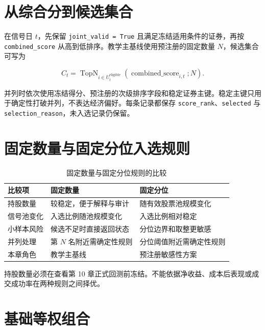 \section{从综合分到候选集合}

在信号日 \(t\)，先保留 \texttt{joint\_valid = True} 且满足冻结适用条件的证券，再按 \texttt{combined\_score} 从高到低排序。教学主基线使用预注册的固定数量 \(N\)，候选集合可写为

\begin{equation}
  C_t
  = \operatorname{TopN}_{i\in U_t^{\mathrm{eligible}}}
    \left(\operatorname{combined\_score}_{i,t};N\right).
  \label{eq:ch09-candidate-set}
\end{equation}

并列时依次使用冻结得分、预注册的次级排序字段和稳定证券主键。稳定主键只用于确定性打破并列，不表达经济偏好。每条记录都保存 \texttt{score\_rank}、\texttt{selected} 与 \texttt{selection\_reason}，未入选记录仍保留。

\section{固定数量与固定分位入选规则}

\begin{table}[htbp]
  \centering
  \small
  \caption{固定数量与固定分位规则的比较}
  \label{tab:ch09-selection-rules}
  \begin{tabularx}{\textwidth}{p{2.6cm} Y Y}
    \toprule
    比较项 & 固定数量 & 固定分位 \\
    \midrule
    持股数量 & 较稳定，便于解释与审计 & 随有效股票池规模变化 \\
    信号池变化 & 入选比例随池规模变化 & 入选比例相对稳定 \\
    小样本风险 & 候选不足时直接返回状态 & 分位边界和取整更敏感 \\
    并列处理 & 第 \(N\) 名附近需确定性规则 & 分位阈值附近需确定性规则 \\
    本章角色 & 教学主基线 & 预注册敏感性方案 \\
    \bottomrule
  \end{tabularx}
\end{table}

持股数量必须在查看第 10 章正式回测前冻结。不能依据净收益、成本后表现或成交成功率在两种规则之间择优。

\section{基础等权组合}

